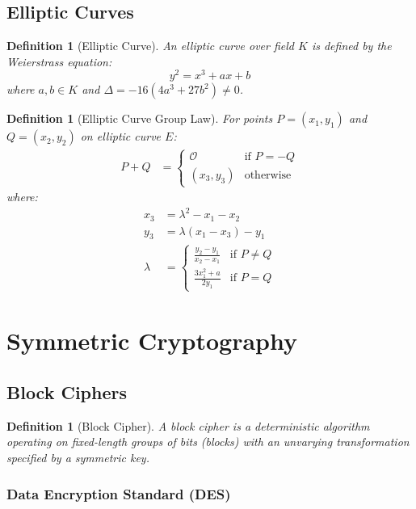 \documentclass[11pt,a4paper]{article}
\newtheorem{definition}[theorem]{Definition}
\begin{document}
\subsection{Elliptic Curves}

\begin{definition}[Elliptic Curve]
An elliptic curve over field $K$ is defined by the Weierstrass equation:
$$y^2 = x^3 + ax + b$$
where $a, b \in K$ and $\Delta = -16(4a^3 + 27b^2) \neq 0$.
\end{definition}

\begin{definition}[Elliptic Curve Group Law]
For points $P = (x_1, y_1)$ and $Q = (x_2, y_2)$ on elliptic curve $E$:
\begin{align}
P + Q &= \begin{cases}
\mathcal{O} & \text{if } P = -Q \\
(x_3, y_3) & \text{otherwise}
\end{cases}
\end{align}
where:
\begin{align}
x_3 &= \lambda^2 - x_1 - x_2 \\
y_3 &= \lambda(x_1 - x_3) - y_1 \\
\lambda &= \begin{cases}
\frac{y_2 - y_1}{x_2 - x_1} & \text{if } P \neq Q \\
\frac{3x_1^2 + a}{2y_1} & \text{if } P = Q
\end{cases}
\end{align}
\end{definition}

\section{Symmetric Cryptography}

\subsection{Block Ciphers}

\begin{definition}[Block Cipher]
A block cipher is a deterministic algorithm operating on fixed-length groups of bits (blocks) with an unvarying transformation specified by a symmetric key.
\end{definition}

\subsubsection{Data Encryption Standard (DES)}
\end{document}

